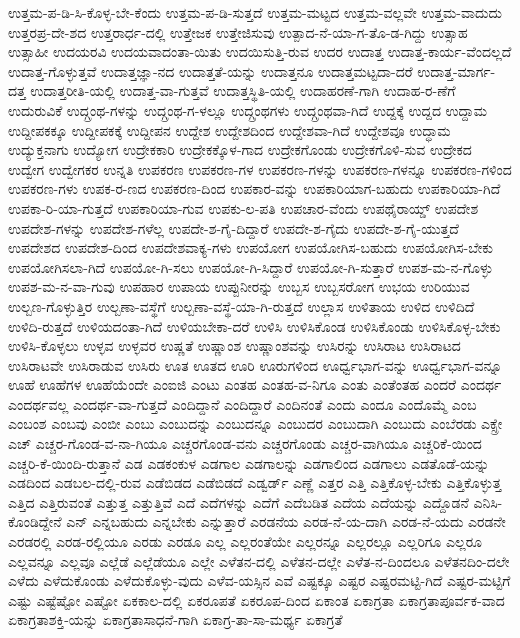 {ಉತ್ತಮ-ಪ-ಡಿ-ಸಿ-ಕೊಳ್ಳ-ಬೇ-ಕೆಂದು
ಉತ್ತಮ-ಪ-ಡಿ-ಸುತ್ತದೆ
ಉತ್ತಮ-ಮಟ್ಟದ
ಉತ್ತಮ-ವಲ್ಲವೇ
ಉತ್ತಮ-ವಾದುದು
ಉತ್ತರಪ್ರ-ದೇ-ಶದ
ಉತ್ತರಾರ್ಧ-ದಲ್ಲಿ
ಉತ್ತೇಜಕ
ಉತ್ತೇಜಿಸುವು
ಉತ್ಪಾದ-ನೆ-ಯಾ-ಗ-ತೊ-ಡ-ಗಿದ್ದು
ಉತ್ಸಾಹ
ಉತ್ಸಾಹೀ
ಉದಯರವಿ
ಉದಯವಾದಂತಾ-ಯಿತು
ಉದಯಿಸುತ್ತಿ-ರುವ
ಉದರ
ಉದಾತ್ತ
ಉದಾತ್ತ-ಕಾರ್ಯ-ವೆಂದಲ್ಲದೆ
ಉದಾತ್ತ-ಗೊಳ್ಳುತ್ತವೆ
ಉದಾತ್ತಜ್ಞಾ-ನದ
ಉದಾತ್ತತೆ-ಯನ್ನು
ಉದಾತ್ತನೂ
ಉದಾತ್ತಮಟ್ಟದಾ-ದರೆ
ಉದಾತ್ತ-ಮಾರ್ಗ-ದತ್ತ
ಉದಾತ್ತರೀತಿ-ಯಲ್ಲಿ
ಉದಾತ್ತ-ವಾ-ಗುತ್ತವೆ
ಉದಾತ್ತಸ್ಥಿತಿ-ಯಲ್ಲಿ
ಉದಾಹರಣೆ-ಗಾಗಿ
ಉದಾಹ-ರ-ಣೆಗೆ
ಉದುರುವಿಕೆ
ಉದ್ಗ್ರಂಥ-ಗಳನ್ನು
ಉದ್ಗ್ರಂಥ-ಗ-ಳಲ್ಲೂ
ಉದ್ಗ್ರಂಥಗಳು
ಉದ್ಗ್ರಂಥವಾ-ಗಿದೆ
ಉದ್ದಕ್ಕೆ
ಉದ್ದದ
ಉದ್ದಾಮ
ಉದ್ದೀಪಕಕ್ಕೂ
ಉದ್ದೀಪಕಕ್ಕೆ
ಉದ್ದೀಪನ
ಉದ್ದೇಶ
ಉದ್ದೇಶದಿಂದ
ಉದ್ದೇಶವಾ-ಗಿದೆ
ಉದ್ದೇಶವೂ
ಉದ್ಧಾಮ
ಉದ್ಯುಕ್ತನಾಗು
ಉದ್ಯೋಗ
ಉದ್ರೇಕಕಾರಿ
ಉದ್ರೇಕಕ್ಕೊಳ-ಗಾದ
ಉದ್ರೇಕಗೊಂಡು
ಉದ್ರೇಕಗೊಳಿ-ಸುವ
ಉದ್ರೇಕದ
ಉದ್ವೇಗ
ಉದ್ವೇಗಕರ
ಉನ್ನತಿ
ಉಪಕರಣ
ಉಪಕರಣ-ಗಳ
ಉಪಕರಣ-ಗಳನ್ನು
ಉಪಕರಣ-ಗಳನ್ನೂ
ಉಪಕರಣ-ಗಳಿಂದ
ಉಪಕರಣ-ಗಳು
ಉಪಕ-ರ-ಣದ
ಉಪಕರಣ-ದಿಂದ
ಉಪಕಾರ-ವನ್ನು
ಉಪಕಾರಿಯಾಗ-ಬಹುದು
ಉಪಕಾರಿಯಾ-ಗಿದೆ
ಉಪಕಾ-ರಿ-ಯಾ-ಗುತ್ತದೆ
ಉಪಕಾರಿಯಾ-ಗುವ
ಉಪಕು-ಲ-ಪತಿ
ಉಪಚಾರ-ವೆಂದು
ಉಪಥೈರಾಯ್ಡ್
ಉಪದೇಶ
ಉಪದೇಶ-ಗಳನ್ನು
ಉಪದೇಶ-ಗಳೆಲ್ಲ
ಉಪದೇ-ಶ-ಗೈ-ದಿದ್ದಾರೆ
ಉಪದೇ-ಶ-ಗೈದು
ಉಪದೇ-ಶ-ಗೈ-ಯುತ್ತದೆ
ಉಪದೇಶದ
ಉಪದೇಶ-ದಿಂದ
ಉಪದೇಶವಾಕ್ಯ-ಗಳು
ಉಪಯೋಗ
ಉಪಯೋಗಿಸ-ಬಹುದು
ಉಪಯೋಗಿಸ-ಬೇಕು
ಉಪಯೋಗಿಸಲಾ-ಗಿದೆ
ಉಪಯೋ-ಗಿ-ಸಲು
ಉಪಯೋ-ಗಿ-ಸಿದ್ದಾರೆ
ಉಪಯೋ-ಗಿ-ಸುತ್ತಾರೆ
ಉಪಶ-ಮ-ನ-ಗೊಳ್ಳು
ಉಪಶ-ಮ-ನ-ವಾ-ಗುವು
ಉಪಹಾರ
ಉಪಾಯ
ಉಪ್ಪುನೀರನ್ನು
ಉಬ್ಬಸ
ಉಬ್ಬಸರೋಗ
ಉಭಯ
ಉರಿಯುವ
ಉಲ್ಬಣ-ಗೊಳ್ಳುತ್ತಿರ
ಉಲ್ಬಣಾ-ವಸ್ಥೆಗೆ
ಉಲ್ಬಣಾ-ವಸ್ಥೆ-ಯಾ-ಗಿ-ರುತ್ತದೆ
ಉಲ್ಲಾಸ
ಉಳಿತಾಯ
ಉಳಿದ
ಉಳಿದಿದೆ
ಉಳಿದಿ-ರುತ್ತದೆ
ಉಳಿಯದಂತಾ-ಗಿದೆ
ಉಳಿಯಬೇಕಾ-ದರೆ
ಉಳಿಸಿ
ಉಳಿಸಿಕೊಂಡ
ಉಳಿಸಿಕೊಂಡು
ಉಳಿಸಿಕೊಳ್ಳ-ಬೇಕು
ಉಳಿಸಿ-ಕೊಳ್ಳಲು
ಉಳ್ಳವ
ಉಳ್ಳವರ
ಉಷ್ಣತೆ
ಉಷ್ಣಾಂಶ
ಉಷ್ಣಾಂಶವನ್ನು
ಉಸಿರನ್ನು
ಉಸಿರಾಟ
ಉಸಿರಾಟದ
ಉಸಿರಾಟವೇ
ಉಸಿರಾಡುವ
ಉಸಿರು
ಊತ
ಊತದ
ಊರಿ
ಊರುಗಳಿಂದ
ಊರ್ಧ್ವಭಾಗ-ವನ್ನು
ಊರ್ಧ್ವಭಾಗ-ವನ್ನೂ
ಊಹೆ
ಊಹೆಗಳ
ಊಹೆಯೆಂದೇ
ಎಂಐಜಿ
ಎಂಟು
ಎಂತಹ
ಎಂತಹ-ವ-ನಿಗೂ
ಎಂತು
ಎಂತೆಂತಹ
ಎಂದರೆ
ಎಂದರ್ಥ
ಎಂದರ್ಥವಲ್ಲ
ಎಂದರ್ಥ-ವಾ-ಗುತ್ತದೆ
ಎಂದಿದ್ದಾನೆ
ಎಂದಿದ್ದಾರೆ
ಎಂದಿನಂತೆ
ಎಂದು
ಎಂದೂ
ಎಂದೊಮ್ಮೆ
ಎಂಬ
ಎಂಬಂಶ
ಎಂಬವು
ಎಂಬೀ
ಎಂಬು
ಎಂಬುದನ್ನು
ಎಂಬುದನ್ನೂ
ಎಂಬುದರ
ಎಂಬುದಾಗಿ
ಎಂಬುದು
ಎಂಬೆರಡು
ಎಕ್ಸ್ರೇ
ಎಚ್
ಎಚ್ಚರ-ಗೊಂಡ-ವ-ನಾ-ಗಿಯೂ
ಎಚ್ಚರಗೊಂಡ-ವನು
ಎಚ್ಚರಗೊಂಡು
ಎಚ್ಚರ-ವಾಗಿಯೂ
ಎಚ್ಚರಿಕೆ-ಯಿಂದ
ಎಚ್ಚರಿ-ಕೆ-ಯಿಂದಿ-ರುತ್ತಾನೆ
ಎಡ
ಎಡಕಂಕುಳ
ಎಡಗಾಲ
ಎಡಗಾಲನ್ನು
ಎಡಗಾಲಿಂದ
ಎಡಗಾಲು
ಎಡತೊಡೆ-ಯನ್ನು
ಎಡದಿಂದ
ಎಡಬಲ-ದಲ್ಲಿ-ರುವ
ಎಡೆಬಿಡದ
ಎಡೆಬಿಡದೆ
ಎಡ್ವರ್ಡ್
ಎಣ್ಣೆ
ಎತ್ತರ
ಎತ್ತಿ
ಎತ್ತಿಕೊಳ್ಳ-ಬೇಕು
ಎತ್ತಿಕೊಳ್ಳುತ್ತ
ಎತ್ತಿದ
ಎತ್ತಿರುವಂತೆ
ಎತ್ತುತ್ತ
ಎತ್ತುತ್ತಿವೆ
ಎದೆ
ಎದೆಗಳನ್ನು
ಎದೆಗೆ
ಎದೆಬಡಿತ
ಎದೆಯ
ಎದೆಯನ್ನು
ಎದ್ದೊಡನೆ
ಎನಿಸಿ-ಕೊಂಡಿದ್ದೇನೆ
ಎನ್
ಎನ್ನಬಹುದು
ಎನ್ನಬೇಕು
ಎನ್ನುತ್ತಾರೆ
ಎರಡನೆಯ
ಎರಡ-ನೆ-ಯ-ದಾಗಿ
ಎರಡ-ನೆ-ಯದು
ಎರಡನೇ
ಎರಡರಲ್ಲಿ
ಎರಡ-ರಲ್ಲಿಯೂ
ಎರಡು
ಎರಡೂ
ಎಲ್ಲ
ಎಲ್ಲರಂತೆಯೇ
ಎಲ್ಲರನ್ನೂ
ಎಲ್ಲರಲ್ಲೂ
ಎಲ್ಲರಿಗೂ
ಎಲ್ಲರೂ
ಎಲ್ಲವನ್ನೂ
ಎಲ್ಲವೂ
ಎಲ್ಲೆಡೆ
ಎಲ್ಲೆಡೆಯೂ
ಎಲ್ಲೇ
ಎಳೆತನ-ದಲ್ಲಿ
ಎಳೆತನ-ದಲ್ಲೇ
ಎಳೆತ-ನ-ದಿಂದಲೂ
ಎಳೆತನದಿಂ-ದಲೇ
ಎಳೆದು
ಎಳೆದುಕೊಂಡು
ಎಳೆದುಕೊಳ್ಳು-ವುದು
ಎಳೆವ-ಯಸ್ಸಿನ
ಎವೆ
ಎಷ್ಟಕ್ಕೂ
ಎಷ್ಟರ
ಎಷ್ಟರಮಟ್ಟಿ-ಗಿದೆ
ಎಷ್ಟರ-ಮಟ್ಟಿಗೆ
ಎಷ್ಟು
ಎಷ್ಟೆಷ್ಟೋ
ಎಷ್ಟೋ
ಏಕಕಾಲ-ದಲ್ಲಿ
ಏಕರೂಪತೆ
ಏಕರೂಪ-ದಿಂದ
ಏಕಾಂತ
ಏಕಾಗ್ರತಾ
ಏಕಾಗ್ರತಾಪೂರ್ವಕ-ವಾದ
ಏಕಾಗ್ರತಾಶಕ್ತಿ-ಯನ್ನು
ಏಕಾಗ್ರತಾಸಾಧನೆ-ಗಾಗಿ
ಏಕಾಗ್ರ-ತಾ-ಸಾ-ಮರ್ಥ್ಯ
ಏಕಾಗ್ರತೆ
}
